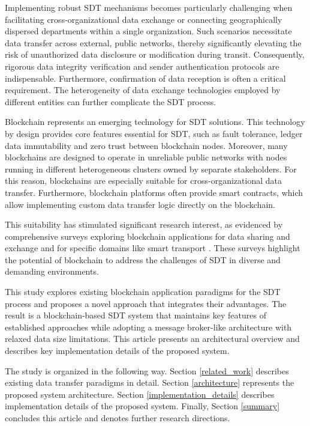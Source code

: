 \documentclass[10pt]{llncs}
\begin{document}
Implementing robust SDT mechanisms becomes particularly challenging when facilitating cross-organizational data exchange or connecting geographically dispersed departments within a single organization.
Such scenarios necessitate data transfer across external, public networks, thereby significantly elevating the risk of unauthorized data disclosure or modification during transit.
Consequently, rigorous data integrity verification and sender authentication protocols are indispensable.
Furthermore, confirmation of data reception is often a critical requirement.
The heterogeneity of data exchange technologies employed by different entities can further complicate the SDT process.

Blockchain represents an emerging technology for SDT solutions.
This technology by design provides core features essential for SDT, such as fault tolerance, ledger data immutability and zero trust between blockchain nodes.
Moreover, many blockchains are designed to operate in unreliable public networks with nodes running in different heterogeneous clusters owned by separate stakeholders.
For this reason, blockchains are especially suitable for cross-organizational data transfer.
Furthermore, blockchain platforms often provide smart contracts, which allow implementing custom data transfer logic directly on the blockchain.

This suitability has stimulated significant research interest, as evidenced by comprehensive surveys exploring blockchain applications for data sharing and exchange \cite{Song2023} and for specific domains like smart transport \cite{Bagga2022}.
These surveys highlight the potential of blockchain to address the challenges of SDT in diverse and demanding environments.

This study explores existing blockchain application paradigms for the SDT process and proposes a novel approach that integrates their advantages. 
The result is a blockchain-based SDT system that maintains key features of established approaches while adopting a message broker-like architecture with relaxed data size limitations. 
This article presents an architectural overview and describes key implementation details of the proposed system.

The study is organized in the following way.
Section \ref{related_work} describes existing data transfer paradigms in detail.
Section \ref{architecture} represents the proposed system architecture.
Section \ref{implementation_details} describes implementation details of the proposed system.
Finally, Section \ref{summary} concludes this article and denotes further research directions.
\end{document}
